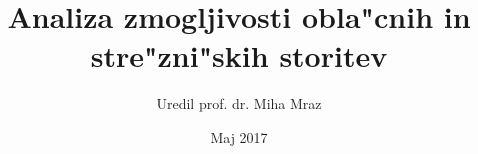 \documentclass[slovene]{book}
\begin{document}
\author{Uredil prof. dr. Miha Mraz}
\title{Analiza zmogljivosti obla"cnih in stre"zni"skih storitev}
\date{Maj 2017}
\maketitle

\frontmatter
\tableofcontents


\mainmatter

 

\backmatter
%
%
\printindex %
\end{document}

